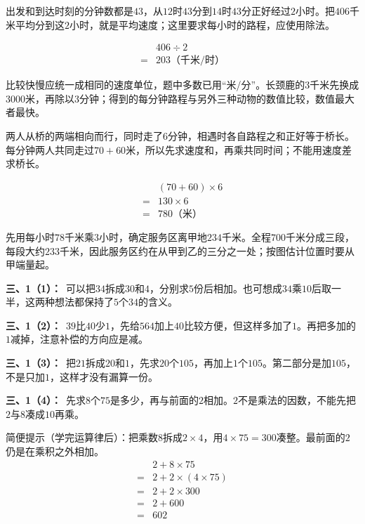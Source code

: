 \documentclass[multi=snippet,border=0pt]{standalone}
\newenvironment{snippet}[3]{\begin{minipage}{#1bp}\color{answerred}\fontsize{#2}{#3}\selectfont\raggedright}{\end{minipage}}
\begin{document}
\begin{snippet}{505}{11.5}{14}出发和到达时刻的分钟数都是\(43\)，从\(12\)时\(43\)分到\(14\)时\(43\)分正好经过\(2\)小时。把\(406\)千米平均分到这\(2\)小时，就是平均速度；这里要求每小时的路程，应使用除法。\par \[\begin{aligned}&406\div2\\={}&203\text{（千米/时）}\end{aligned}\]\end{snippet}
\begin{snippet}{505}{11.5}{14}比较快慢应统一成相同的速度单位，题中多数已用“米/分”。长颈鹿的\(3\)千米先换成\(3000\)米，再除以\(3\)分钟；得到的每分钟路程与另外三种动物的数值比较，数值最大者最快。\end{snippet}
\begin{snippet}{505}{11.5}{14}两人从桥的两端相向而行，同时走了\(6\)分钟，相遇时各自路程之和正好等于桥长。每分钟两人共同走过\(70+60\)米，所以先求速度和，再乘共同时间；不能用速度差求桥长。\par \[\begin{aligned}&(70+60)\times6\\={}&130\times6\\={}&780\text{（米）}\end{aligned}\]\end{snippet}
\begin{snippet}{505}{11.5}{14}先用每小时\(78\)千米乘\(3\)小时，确定服务区离甲地\(234\)千米。全程\(700\)千米分成三段，每段大约\(233\)千米，因此服务区约在从甲到乙的三分之一处；按图估计位置时要从甲端量起。\end{snippet}
\begin{snippet}{505}{11.5}{14}\textbf{三、1（1）：}\ 可以把\(34\)拆成\(30\)和\(4\)，分别求\(5\)份后相加。也可想成\(34\)乘\(10\)后取一半，这两种想法都保持了\(5\)个\(34\)的含义。\end{snippet}
\begin{snippet}{505}{11.5}{14}\textbf{三、1（2）：}\ \(39\)比\(40\)少\(1\)，先给\(564\)加上\(40\)比较方便，但这样多加了\(1\)。再把多加的\(1\)减掉，注意补偿的方向应是减。\end{snippet}
\begin{snippet}{505}{11.5}{14}\textbf{三、1（3）：}\ 把\(21\)拆成\(20\)和\(1\)，先求\(20\)个\(105\)，再加上\(1\)个\(105\)。第二部分是加\(105\)，不是只加\(1\)，这样才没有漏算一份。\end{snippet}
\begin{snippet}{505}{11.5}{14}\textbf{三、1（4）：}\ 先求\(8\)个\(75\)是多少，再与前面的\(2\)相加。\(2\)不是乘法的因数，不能先把\(2\)与\(8\)凑成\(10\)再乘。\par 简便提示（学完运算律后）：把乘数\(8\)拆成\(2\times4\)，用\(4\times75=300\)凑整。最前面的\(2\)仍是在乘积之外相加。\[\begin{aligned}&2+8\times75\\={}&2+2\times(4\times75)\\={}&2+2\times300\\={}&2+600\\={}&602\end{aligned}\]\end{snippet}
\end{document}
